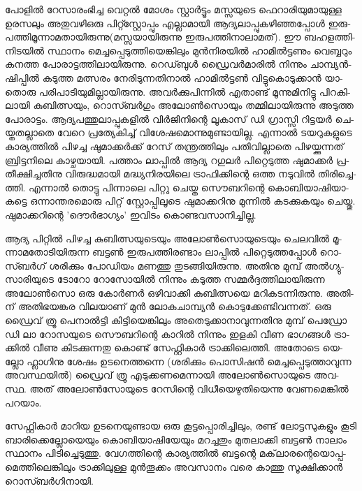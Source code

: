 ­പോ­ളില്‍ റേ­സാ­രം­ഭി­ച്ച വെ­റ്റല്‍ മോ­ശം സ്റ്റാര്‍­ട്ടൂം മസ്സ­യു­ടെ ഫെ­റാ­രി­യു­മാ­യു­ള്ള ഉര­സ­ലും അതു­വ­ഴി­ഒ­രു പി­റ്റ്സ്റ്റോ­പ്പും എല്ലാ­മാ­യി 
ആദ്യ­ലാ­പ്പു­ക­ഴി­ഞ്ഞ­പ്പോള്‍ ഇരു­പ­ത്തി­മൂ­ന്നാ­മ­താ­യി­രു­ന്നു­(­മ­സ്സ­യാ­യി­രു­ന്നു ഇരു­പ­ത്തി­നാ­ലാ­മ­ത്). ഈ ബഹ­ള­ത്തി­നി­ട­യില്‍ സ്ഥാ­നം 
മെ­ച്ച­പ്പെ­ടു­ത്തി­യെ­ങ്കി­ലും മുന്‍­നി­ര­യില്‍ ഹാ­മില്‍­ട്ട­ണും വെ­ബ്ബ­റും കന­ത്ത പോ­രാ­ട്ട­ത്തി­ലാ­യി­രു­ന്നു. റെ­ഡ്ബുള്‍ ഡ്രൈ­വര്‍­മാ­രില്‍ നി­ന്നും
 ചാ­മ്പ്യന്‍­ഷി­പ്പില്‍ കടു­ത്ത മത്സ­രം നേ­രി­ടു­ന്ന­തി­നാല്‍ ഹാ­മില്‍­ട്ടണ്‍ വി­ട്ടു­കൊ­ടു­ക്കാന്‍ യാ­തൊ­രു പരി­പാ­ടി­യു­മി­ല്ലാ­യി­രു­ന്നു. അവര്‍­ക്കു­പി­ന്നില്‍ 
 എതാ­ണ്ട് മൂ­ന്നു­മി­നി­ട്ടു പി­റ­കി­ലാ­യി കു­ബി­ത്സ­യും, റൊ­സ്ബര്‍­ഗും അലോണ്‍­സൊ­യും തമ്മി­ലാ­യി­രു­ന്നു അടു­ത്ത പോ­രാ­ട്ടം. 
 ആദ്യ­പ­ത്തു­ലാ­പ്പു­ക­ളില്‍ വിര്‍­ജി­നി­ന്റെ ­ലൂ­കാ­സ് ഡി ഗ്രാ­സ്സി­ റി­ട്ട­യര്‍ ചെ­യ്ത­ത­ല്ലാ­തെ വേ­റെ പ്ര­ത്യേ­കി­ച്ച് വി­ശേ­ഷ­മൊ­ന്നു­മു­ണ്ടാ­യി­ല്ല. 
 എന്നാല്‍ ടയ­റു­ക­ളു­ടെ കാ­ര്യ­ത്തില്‍ പി­ഴ­ച്ച ഷു­മാ­ക്കര്‍­ക്ക് റേ­സ് തന്ത്ര­ത്തി­ലും പതി­വി­ല്ലാ­തെ പി­ഴ­യ്ക്കു­ന്ന­ത് ബ്രി­ട്ട­നി­ലെ കാ­ഴ്ച­യാ­യി. 
 പത്താം ലാ­പ്പില്‍ ആദ്യ റഗു­ലര്‍ പി­റ്റെ­ടു­ത്ത ഷു­മാ­ക്കര്‍ പ്ര­തീ­ക്ഷി­ച്ച­തി­നു വി­രു­ദ്ധ­മാ­യി മദ്ധ്യ­നി­ര­യി­ലെ ട്രാ­ഫി­ക്കി­ന്റെ ഒത്ത നടു­വില്‍ 
 തി­രി­ച്ചെ­ത്തി. എന്നാല്‍ തൊ­ട്ടു പി­ന്നാ­ലെ പി­റ്റു ചെ­യ്ത സൌ­ബ­റി­ന്റെ കൊ­ബി­യാ­ഷി­യാ­ക­ട്ടെ ഒന്നാ­ന്ത­ര­മൊ­രു പി­റ്റ് സ്റ്റോ­പ്പി­ലൂ­ടെ 
 ഷു­മാ­ക്ക­റി­നു മു­ന്നില്‍ കട­ക്കു­ക­യും ചെ­യ്തു. ഷു­മാ­ക്ക­റി­ന്റെ 'ദൌര്‍­ഭാ­ഗ്യം' ഇവി­ടം കൊ­ണ്ട­വ­സാ­നി­ച്ചി­ല്ല.

ആ­ദ്യ പി­റ്റില്‍ പി­ഴ­ച്ച കു­ബി­ത്സ­യു­ടെ­യും അലോണ്‍­സൊ­യു­ടെ­യും ചെ­ല­വില്‍ മൂ­ന്നാ­മ­തോ­ടി­യി­രു­ന്ന ബട്ടണ്‍ ഇരു­പ­ത്തി­ര­ണ്ടാം ലാ­പ്പില്‍ 
പി­റ്റെ­ടു­ത്ത­പ്പോള്‍ ­റൊ­സ്ബര്‍­ഗ് ശരി­ക്കും പോ­ഡി­യം മണ­ത്തു തു­ട­ങ്ങി­യി­രു­ന്നു. അതി­നു മു­മ്പ് അല്‍­ഗ്യു­സാ­രി­യു­ടെ ടോ­റോ റോ­സോ­യില്‍ 
നി­ന്നും കടു­ത്ത സമ്മര്‍­ദ്ദ­ത്തി­ലാ­യി­രു­ന്ന അലോണ്‍­സൊ ഒരു കോര്‍­ണര്‍ ഒഴി­വാ­ക്കി കു­ബി­ത്സ­യെ മറി­ക­ട­ന്നി­രു­ന്നു. അതി­ന് അതി­ഭ­യ­ങ്കര 
വി­ല­യാ­ണ് മുന്‍ ലോ­ക­ചാ­മ്പ്യന്‍ കൊ­ടു­ക്കേ­ണ്ടി­വ­ന്ന­ത്. ഒരു ഡ്രൈ­വ് ത്രൂ പെ­നാല്‍­ട്ടി കി­ട്ടി­യെ­ങ്കി­ലും അതെ­ടു­ക്കാ­നാ­വു­ന്ന­തി­നു മു­മ്പ് 
പെ­ഡ്രോ ഡി ലാ റോ­സ­യു­ടെ സൌ­ബ­റി­ന്റെ കാ­റില്‍ നി­ന്നും ഇള­കി വീണ ഭാ­ഗ­ങ്ങള്‍ ട്രാ­ക്കില്‍ വീ­ണു കി­ട­ക്കു­ന്ന­തു കൊ­ണ്ട് സേ­ഫ്റ്റി­കാര്‍ 
ട്രാ­ക്കി­ലെ­ത്തി. അതോ­ടെ യെ­ല്ലോ ഫ്ലാ­ഗി­നു ശേ­ഷം ഉട­നെ­ത്ത­ന്നെ (ശ­രി­ക്കും പൊ­സി­ഷന്‍ മെ­ച്ച­പ്പെ­ടു­ത്താ­വു­ന്ന അവ­സ്ഥ­യില്‍) 
ഡ്രൈ­വ് ത്രൂ എടു­ക്ക­ണ­മെ­ന്നാ­യി അലോണ്‍­സൊ­യു­ടെ അവ­സ്ഥ. അത് അലോണ്‍­സോ­യു­ടെ റേ­സി­ന്റെ വി­ധീ­യെ­ഴു­തി­യെ­ന്നു വേ­ണ­മെ­ങ്കില്‍ പറ­യാം­.

­സേ­ഫ്റ്റി­കാര്‍ മാ­റിയ ഉട­നെ­യു­ണ്ടായ ഒരു കൂ­ട്ട­പ്പൊ­രി­ച്ചി­ലും, രണ്ട് ലോ­ട്ട­സു­ക­ളും കൂ­ടി ബാ­രി­ക്കെ­ല്ലോ­യെ­യും കൊ­ബി­യാ­ഷി­യേ­യും മറ­ച്ച­തും
 മു­ത­ലാ­ക്കി ബട്ടണ്‍ നാ­ലാം സ്ഥാ­നം പി­ടി­ച്ചെ­ടു­ത്തു. വേ­ഗ­ത്തി­ന്റെ കാ­ര്യ­ത്തില്‍ ബട്ട­ന്റെ മക്‌­ലാ­ര­ന്റെ­യൊ­പ്പ­മെ­ത്തി­ലെ­ങ്കി­ലും ട്രാ­ക്കി­ലു­ള്ള 
 മുന്‍­തൂ­ക്കം അവ­സാ­നം വരെ കാ­ത്തു സൂ­ക്ഷി­ക്കാന്‍ റൊ­സ്ബര്‍­ഗി­നാ­യി­.

